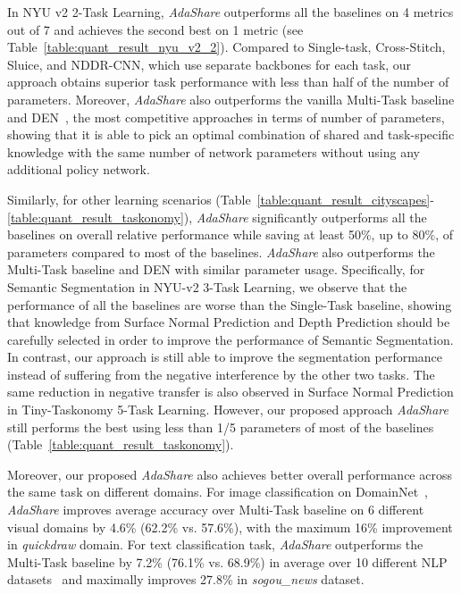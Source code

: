 In NYU v2 2-Task Learning, \textit{AdaShare} outperforms all the baselines on 4 metrics out of 7 and achieves the second best on 1 metric (see Table~\ref{table:quant_result_nyu_v2_2}). Compared to Single-task, Cross-Stitch, Sluice, and NDDR-CNN, which use separate backbones for each task, our approach obtains superior task performance {with less than half of the number of parameters}. Moreover, \textit{AdaShare} also outperforms the vanilla Multi-Task baseline and DEN~\cite{ahn2019deep}, the most competitive approaches in terms of number of parameters, showing that it is able to pick an optimal combination of shared and task-specific knowledge with the same number of network parameters without using any additional policy network. 

Similarly, for other learning scenarios (Table~\ref{table:quant_result_cityscapes}-\ref{table:quant_result_taskonomy}), \textit{AdaShare} significantly outperforms all the baselines on overall relative performance while saving at least 50\%, up to 80\%, of parameters compared to most of the baselines.
\textit{AdaShare} also outperforms the Multi-Task baseline and DEN with similar parameter usage. Specifically, for Semantic Segmentation in NYU-v2 3-Task Learning, we observe that the performance of all the baselines are worse than the Single-Task baseline, showing that knowledge from Surface Normal Prediction and Depth Prediction should be carefully selected in order to improve the performance of Semantic Segmentation. In contrast, our approach is still able to improve the segmentation performance instead of suffering from the negative interference by the other two tasks. The same reduction in negative transfer is also observed in Surface Normal Prediction in Tiny-Taskonomy 5-Task Learning. However, our proposed approach \textit{AdaShare} still performs the best using less than 1/5 parameters of most of the baselines (Table~\ref{table:quant_result_taskonomy}).  

Moreover, our proposed \textit{AdaShare} also achieves better overall performance across the same task on different domains. For image classification on DomainNet~\cite{peng2019moment}, \textit{AdaShare} improves average accuracy over Multi-Task baseline on 6 different visual domains by 4.6\% (62.2\% vs. 57.6\%), with the maximum 16\% improvement in \textit{quickdraw} domain. For text classification task, \textit{AdaShare} outperforms the Multi-Task baseline by 7.2\% (76.1\% vs. 68.9\%) in average over 10 different NLP datasets~\cite{chen2018exploring} and maximally improves 27.8\% in \textit{sogou\_news} dataset. 

